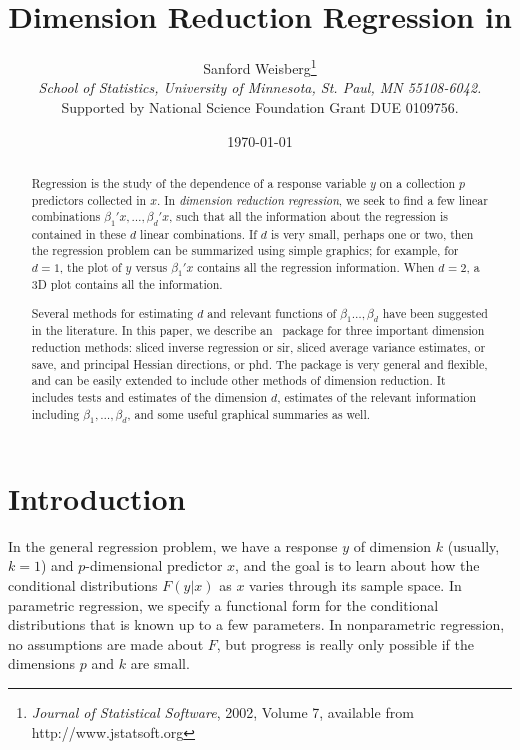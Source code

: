 \documentclass{article}
\title{Dimension Reduction Regression in \R}
\author{Sanford Weisberg\thanks{
{\em Journal of Statistical Software}, 2002, Volume 7, available from
http://www.jstatsoft.org}\\
{\small \sl
School of Statistics, University of Minnesota, St. Paul,
MN 55108-6042.}\\
{\small Supported by National Science Foundation Grant DUE 0109756.}}
\date{\today}
\newcommand{\sir}{{\sffamily sir}}
\newcommand{\save}{{\sffamily save}}
\newcommand{\phd}{{\sffamily phd}}
\begin{document}
\maketitle

\begin{abstract}
Regression is the study of the dependence of a response variable
$y$ on a collection $p$ predictors collected in $x$. In {\em
dimension reduction regression}, we seek to find a few linear
combinations $\beta_1'x,\ldots,\beta_d'x$, such that all the
information about the regression is contained in these $d$ linear
combinations.  If $d$ is very small, perhaps one or two, then the
regression problem can be summarized using simple graphics; for
example, for $d=1$, the plot of $y$ versus $\beta_1'x$ contains
all the regression information.  When $d=2$, a 3D plot contains
all the information.

Several methods for estimating $d$ and relevant functions of
$\beta_1\ldots,\beta_d$ have been suggested in the literature.  In
this paper, we describe an
\R\ package for three important dimension reduction methods:
sliced inverse regression or
\sir, sliced average variance estimates, or \save, and principal
Hessian directions, or \phd.  The package is very general and
flexible, and can be easily extended to include other methods of
dimension reduction.  It includes tests and estimates of the
dimension $d$, estimates of the relevant information including
$\beta_1,\ldots,\beta_d$, and some useful graphical summaries as
well.
\end{abstract}

\section{Introduction}
In the general regression problem, we have a response $y$ of
dimension $k$ (usually, $k=1$) and $p$-dimensional predictor $x$,
and the goal is to learn about how the conditional distributions
$F(y|x)$ as $x$ varies through its sample space.  In parametric
regression, we specify a functional form for the conditional
distributions that is known up to a few parameters.  In
nonparametric regression, no assumptions are made about $F$, but
progress is really only possible if the dimensions $p$ and $k$ are
small.
\end{document}
